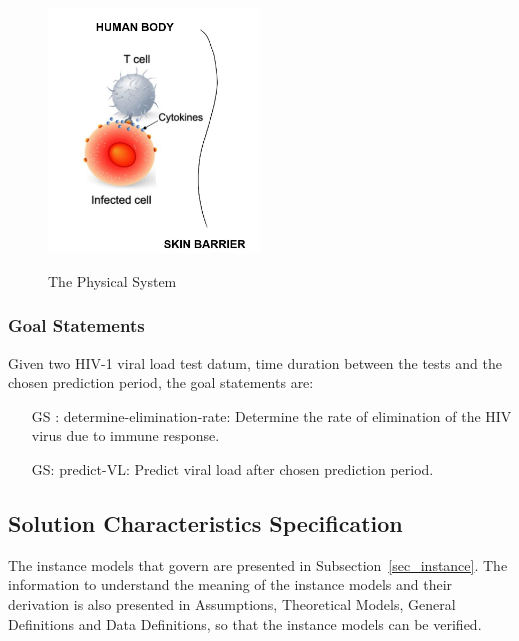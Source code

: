 \documentclass[12pt]{article}
\newcounter{goalnum} %
\begin{document}
 \begin{figure}[H]
 \begin{center}
 {
  \includegraphics[width=0.5\textwidth]{physicalsys.JPG}
 }
 \caption{The Physical System}\citep{wikifig}

 \label{Fig_PhysicalSystem}
 \end{center}
 \end{figure}

\subsubsection{Goal Statements}

\noindent Given two HIV-1 viral load test datum, time duration between the tests 
and the chosen prediction period, the goal 
statements are:

\begin{itemize}

\item[GS\refstepcounter{goalnum}\thegoalnum 
\label{G_determine-elimination-rate}:] 
determine-elimination-rate: Determine the rate of elimination of the HIV virus 
due 
to immune response.

\item[GS\refstepcounter{goalnum}\thegoalnum \label{G_predict-VL-30}:] 
predict-VL: Predict viral load after chosen prediction period.

\end{itemize}

\newpage

\subsection{Solution Characteristics Specification}


The instance models that govern \progname{} are presented in
Subsection~\ref{sec_instance}.  The information to understand the meaning of the
instance models and their derivation is also presented in Assumptions, 
Theoretical Models, General Definitions and Data Definitions, so that the 
instance
models can be verified.
\end{document}
